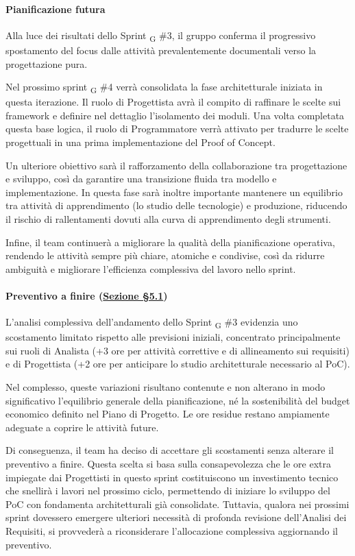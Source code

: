 ﻿\documentclass[a4paper, 10pt, colorlinks=true, linkcolor=black, urlcolor=blue, citecolor=blue, hidelinks]{article}
\begin{document}
\paragraph{Pianificazione futura}
Alla luce dei risultati dello Sprint \textsubscript{G} \#3, il gruppo conferma il progressivo spostamento del focus dalle attività prevalentemente documentali verso la progettazione pura.

Nel prossimo sprint \textsubscript{G} \#4 verrà consolidata la fase architetturale iniziata in questa iterazione. Il ruolo di Progettista avrà il compito di raffinare le scelte sui framework e definire nel dettaglio l'isolamento dei moduli. Una volta completata questa base logica, il ruolo di Programmatore verrà attivato per tradurre le scelte progettuali in una prima implementazione del Proof of Concept.

Un ulteriore obiettivo sarà il rafforzamento della collaborazione tra progettazione e sviluppo, così da garantire una transizione fluida tra modello e implementazione. In questa fase sarà inoltre importante mantenere un equilibrio tra attività di apprendimento (lo studio delle tecnologie) e produzione, riducendo il rischio di rallentamenti dovuti alla curva di apprendimento degli strumenti.

Infine, il team continuerà a migliorare la qualità della pianificazione operativa, rendendo le attività sempre più chiare, atomiche e condivise, così da ridurre ambiguità e migliorare l’efficienza complessiva del lavoro nello sprint.

\paragraph{Preventivo a finire (\hyperref[tab:preventivo-finire]{Sezione \S5.1})}
L’analisi complessiva dell’andamento dello Sprint \textsubscript{G} \#3 evidenzia uno scostamento limitato rispetto alle previsioni iniziali, concentrato principalmente sui ruoli di Analista (+3 ore per attività correttive e di allineamento sui requisiti) e di Progettista (+2 ore per anticipare lo studio architetturale necessario al PoC).

Nel complesso, queste variazioni risultano contenute e non alterano in modo significativo l’equilibrio generale della pianificazione, né la sostenibilità del budget economico definito nel Piano di Progetto. Le ore residue restano ampiamente adeguate a coprire le attività future.

Di conseguenza, il team ha deciso di accettare gli scostamenti senza alterare il preventivo a finire. Questa scelta si basa sulla consapevolezza che le ore extra impiegate dai Progettisti in questo sprint costituiscono un investimento tecnico che snellirà i lavori nel prossimo ciclo, permettendo di iniziare lo sviluppo del PoC con fondamenta architetturali già consolidate. Tuttavia, qualora nei prossimi sprint dovessero emergere ulteriori necessità di profonda revisione dell'Analisi dei Requisiti, si provvederà a riconsiderare l’allocazione complessiva aggiornando il preventivo.
\end{document}
